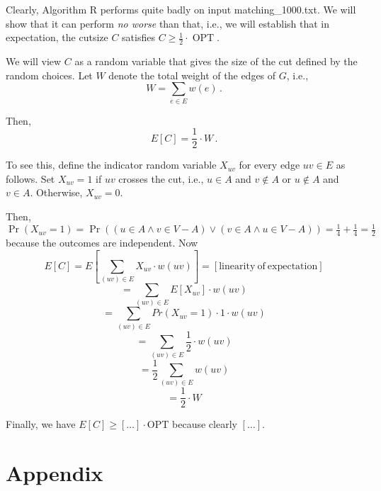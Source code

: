 \documentclass{tufte-handout}
\begin{document}
Clearly, Algorithm R performs quite badly on input 
  matching\_1000.txt.
We will show that it can perform \emph{no worse} than that, i.e., we
will establish that in expectation, the cutsize $C$ satisfies $C \geq
\frac{1}{2}\cdot \operatorname{OPT}$.\


We will view $C$ as a random variable that gives the size of the cut
defined by the random choices.
Let $W$ denote the total weight of the edges of $G$, i.e.,
\[ W= \sum_{e\in E} w(e)\,.\]

Then,
\begin{equation}\label{eq: E[C]}
E[C] = \textstyle\frac{1}{2}\cdot W\,.
\end{equation}

To see this, define the indicator random variable $X_{uv}$ for every
edge $uv\in E$ as follows.
Set $X_{uv}=1$ if $uv$ crosses the cut, i.e., $u\in A$ and $v\notin A$
or $u\notin A$ and $v\in A$.
Otherwise, $X_{uv} = 0$.

Then, $\Pr(X_{uv} = 1) = \Pr((u\in A \land v \in V-A) \lor  (v\in A \land u \in V-A))=\frac{1}{4}+\frac{1}{4}=\frac{1}{2}$ because the outcomes are independent.
Now
\begin{equation*}
	E[C]=E[\sum_{(uv)\in E}X_{uv}\cdot w(uv)]=[\mathrm{linearity~of~expectation}]
\end{equation*}
\begin{equation*}
	=\sum_{(uv)\in E}E[X_{uv}]\cdot w(uv)
\end{equation*}
\begin{equation*}
	=\sum_{(uv) \in E} Pr(X_{uv}=1)\cdot 1 \cdot w(uv)
\end{equation*}
\begin{equation*}
	=\sum_{(uv) \in E} \frac{1}{2}\cdot w(uv)
\end{equation*}
\begin{equation*}
	=\frac{1}{2}\sum_{(uv) \in E} w(uv)
\end{equation*}
\begin{equation*}
	=\frac{1}{2} \cdot W
\end{equation*}

Finally, we have 
\(E[C]\geq [\ldots]\cdot \text{OPT}\) because clearly
$[\ldots]$.


\newpage
\section*{Appendix}
\appendix

\end{document}
